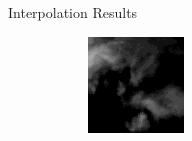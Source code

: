 \documentclass{beamer}
\begin{document}
\begin{frame}{Interpolation Results}
	\begin{figure}
	    \begin{subfigure}{.3\textwidth}
	        \centering
	        \includegraphics[width=\linewidth]{fig/inter/2.png}
	    \end{subfigure}
	\end{figure}
\end{frame}
\end{document}
